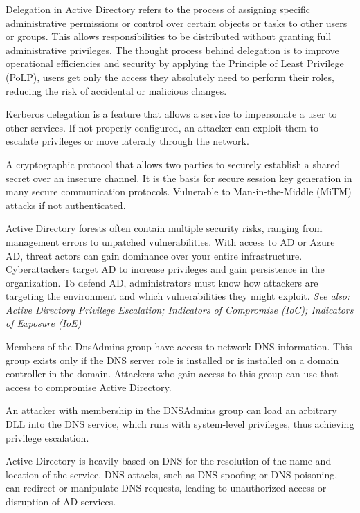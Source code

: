  Delegation in Active Directory refers to the process of assigning specific administrative permissions or control over certain objects or tasks to other users or groups. This allows responsibilities to be distributed without granting full administrative privileges. The thought process behind delegation is to improve operational efficiencies and security by applying the Principle of Least Privilege (PoLP), users get only the access they absolutely need to perform their roles, reducing the risk of accidental or malicious changes.

 Kerberos delegation is a feature that allows a service to impersonate a user to other services. If not properly configured, an attacker can exploit them to escalate privileges or move laterally through the network.

 A cryptographic protocol that allows two parties to securely establish a shared secret over an insecure channel. It is the basis for secure session key generation in many secure communication protocols. Vulnerable to Man-in-the-Middle (MiTM) attacks if not authenticated.

 Active Directory forests often contain multiple security risks, ranging from management errors to unpatched vulnerabilities. With access to AD or Azure AD, threat actors can gain dominance over your entire infrastructure. Cyberattackers target AD to increase privileges and gain persistence in the organization. To defend AD, administrators must know how attackers are targeting the environment and which vulnerabilities they might exploit.
\textit{See also: Active Directory Privilege Escalation; Indicators of Compromise (IoC); Indicators of Exposure (IoE)}

 Members of the DnsAdmins group have access to network DNS information. This group exists only if the DNS server role is installed or is installed on a domain controller in the domain. Attackers who gain access to this group can use that access to compromise Active Directory.

 An attacker with membership in the DNSAdmins group can load an arbitrary DLL into the DNS service, which runs with system-level privileges, thus achieving privilege escalation.

 Active Directory is heavily based on DNS for the resolution of the name and location of the service. DNS attacks, such as DNS spoofing or DNS poisoning, can redirect or manipulate DNS requests, leading to unauthorized access or disruption of AD services.

